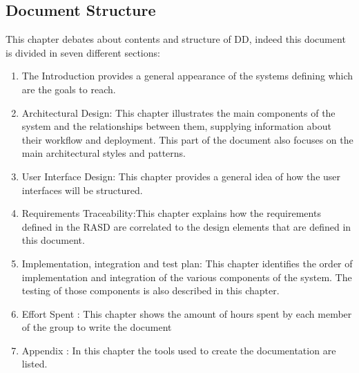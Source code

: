 \subsection{Document Structure}
This chapter debates about contents and structure of DD, indeed this document is divided in seven different sections:
\begin{enumerate}
\item	The Introduction provides a general appearance of the systems defining which are the goals to reach.
\item Architectural Design: This chapter illustrates the main components of the system and the relationships between them, supplying information about their workflow and deployment. This part of the document also focuses on the main architectural styles and patterns.
\item User Interface Design: This chapter provides a general idea of how the user interfaces will be structured.
\item  Requirements Traceability:This chapter explains how the requirements defined in the RASD are correlated to the design elements that are defined in this document.
\item  Implementation, integration and test plan: This chapter identifies the order of implementation and integration of the various components of the system. The testing of those components is also described in this chapter.
\item  Effort Spent : This chapter shows the amount of hours spent by each member of the group to write the document
\item  Appendix : In this chapter the tools used to create the documentation are listed.
\end{enumerate}

